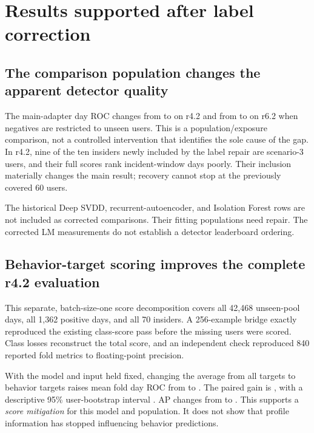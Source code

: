 \section{Results supported after label correction}
\label{sec:findings}
\subsection{The comparison population changes the apparent detector quality}
\begin{center}\end{center}
The main-adapter day ROC changes from  to
 on r4.2 and from  to
 on r6.2 when negatives are restricted to unseen
users. This is a population/exposure comparison, not a controlled intervention
that identifies the sole cause of the gap. In r4.2, nine of the ten insiders
newly included by the label repair are scenario-3 users, and their full scores
rank incident-window days poorly. Their inclusion materially changes the main
result; recovery cannot stop at the previously covered 60 users.

The historical Deep SVDD, recurrent-autoencoder, and Isolation Forest rows are
not included as corrected comparisons. Their fitting populations need repair.
The corrected LM measurements do not establish a detector leaderboard ordering.

\subsection{Behavior-target scoring improves the complete r4.2 evaluation}
\begin{center}\end{center}
This separate, batch-size-one score decomposition covers all 42,468 unseen-pool
days, all 1,362 positive days, and all 70 insiders. A 256-example bridge exactly
reproduced the existing class-score pass before the missing users were scored.
Class losses reconstruct the total score, and an independent check reproduced
840 reported fold metrics to floating-point precision.

With the model and input held fixed, changing the average from all targets to
behavior targets raises mean fold day ROC from  to
. The paired gain is , with a
descriptive 95\% user-bootstrap interval . AP changes from
 to . This supports a
\emph{score mitigation} for this model and population. It does not show that
profile information has stopped influencing behavior predictions.

